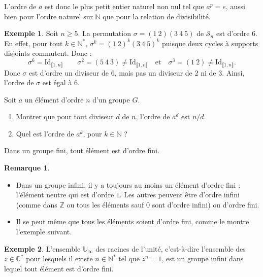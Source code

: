 \documentclass[french]{article}
\newcommand{\N}{\mathbb{N}}
\newcommand{\Z}{\mathbb{Z}}
\newcommand{\C}{\mathbb{C}}
\newcommand{\U}{\mathbb{U}}
\newcommand{\st}{^*}
\theoremstyle{plain}
\theoremstyle{definition}
\newtheorem*{ex}{Exemple}
\newtheorem*{rmq}{Remarque}
\theoremstyle{remark}
\begin{document}
L'ordre de $a$ est donc le plus petit entier naturel non nul tel que $a^p=e$, aussi bien pour l'ordre naturel sur $\N$ que pour la relation de divisibilité.

\begin{ex}
	Soit $n\geqslant 5$. La permutation $\sigma=(1\ 2)(3\ 4\ 5)$ de $\mathcal{S}_n$ est d'ordre $6$. \\
	En effet, pour tout $k\in\N\st$, $\sigma^k=(1\ 2)^k(3\ 4\ 5)^k$ puisque deux cycles à supports disjoints commutent. Donc :
	$$\sigma^6=\text{Id}_{\llbracket1,n\rrbracket}\quad\quad \sigma^2=(5\ 4\ 3)\ne\text{Id}_{\llbracket1,n\rrbracket}\quad\text{et}\quad\sigma^3=(1\ 2)\ne\text{Id}_{\llbracket1,n\rrbracket}.$$
	Donc $\sigma$ est d'ordre un diviseur de $6$, mais pas un diviseur de $2$ ni de $3$. Ainsi, l'ordre de $\sigma$ est égal à $6$.
\end{ex}

\begin{exo}
	Soit $a$ un élément d'ordre $n$ d'un groupe $G$.
	\begin{enumerate}
		\item Montrer que pour tout diviseur $d$ de $n$, l'ordre de $a^d$ est $n/d$.
		\item Quel est l'ordre de $a^k$, pour $k\in\N$ ?
	\end{enumerate}
\end{exo}

\begin{cor}%
	Dans un groupe fini, tout élément est d'ordre fini.
\end{cor}

\begin{rmq}
	\begin{itemize}
		\item Dans un groupe infini, il y a toujours au moins un élément d'ordre fini : l'élément neutre qui est d'ordre $1$. Les autres peuvent être d'ordre infini (comme dans $\Z$ ou tous les éléments sauf $0$ sont d'ordre infini) ou d'ordre fini.
		\item Il se peut même que tous les éléments soient d'ordre fini, comme le montre l'exemple suivant.
	\end{itemize}
\end{rmq}

\begin{ex}
	L'ensemble $\U_\infty$ des racines de l'unité, c'est-à-dire l'ensemble des $z\in\C\st$ pour lesquels il existe $n\in\N\st$ tel que $z^n=1$, est un groupe infini dans lequel tout élément est d'ordre fini.
\end{ex}
\end{document}
